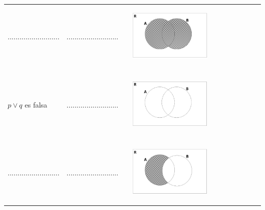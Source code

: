 \documentclass[12pt]{article}
\theoremstyle{definition}
\theoremstyle{remark}
\begin{document}
\begin{enumerate}
\begin{table}[ H]
\begin{center}
\begin{tabular} { l c c l }
$..........................$&$..........................$ & & \begin{minipage}{5cm} \begin{center} 
\includegraphics[width=0.6\textwidth]{tp3_fig5} 
\end{center}
\end{minipage}\\ \\ 
 $p \vee q$ es falsa& $..........................$& & \begin{minipage}{5cm} \begin{center} 
\includegraphics[width=0.6\textwidth]{tp3_fig6} 
\end{center}
\end{minipage}\\ \\   
$..........................$&$..........................$ & & \begin{minipage}{5cm} \begin{center} 
\includegraphics[width=0.6\textwidth]{tp3_fig7} 
\end{center}

\end{minipage}
\end{tabular}
\end{center}
\end{table}
\end{enumerate}
\end{document}
